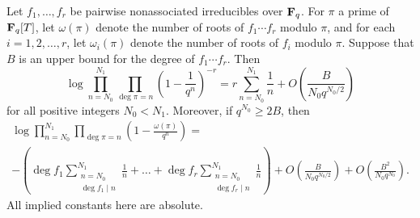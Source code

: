 \documentclass[a4paper]{compositio}
\begin{document}
\begin{lem}\label{lem:estimate} Let $f_1, \dots, f_r$ be pairwise nonassociated
irreducibles over $\mathbf{F}_q$. For $\pi$ a prime of $\mathbf{F}_q[T]$, let
$\omega(\pi)$ denote the number of roots of $f_1\cdots f_r$ modulo
$\pi$, and for each $i=1,2, \dots, r$, let $\omega_i(\pi)$ denote
the number of roots of $f_i$ modulo $\pi$. Suppose that $B$ is an
upper bound for the degree of $f_1\cdots f_r$. Then
\begin{equation}\label{eq:sprod} \log \prod_{n=N_0}^{N_1} \prod_{\deg{\pi}=n}
\left(1 - \frac{1}{q^n}\right)^{-r} = r
\sum_{n=N_0}^{N_1}\frac{1}{n} + O\left(\frac{B}{N_0
q^{N_0/2}}\right)
\end{equation} for all positive integers $N_0 < N_1$. Moreover, if
$q^{N_0} \geq 2B$, then
\begin{multline}\label{eq:sprod2}
 \log \prod_{n=N_0}^{N_1} \prod_{\deg{\pi}=n} \left(1 -
\frac{\omega(\pi)}{q^n}\right) = \\
-\left(\deg{f_1}\sum_{\substack{n=N_0
\\ \deg{f_1} \mid n}}^{N_1}\frac{1}{n} +\dots+ \deg{f_r}\sum_{\substack{n=N_0
\\ \deg{f_r} \mid n}}^{N_1}\frac{1}{n} \right) +
O\left(\frac{B}{N_0 q^{N_0/2}}\right) + O\left(\frac{B^2}{N_0
q^{N_0}}\right).
\end{multline} All implied constants here
are absolute.
\end{lem}
\end{document}
